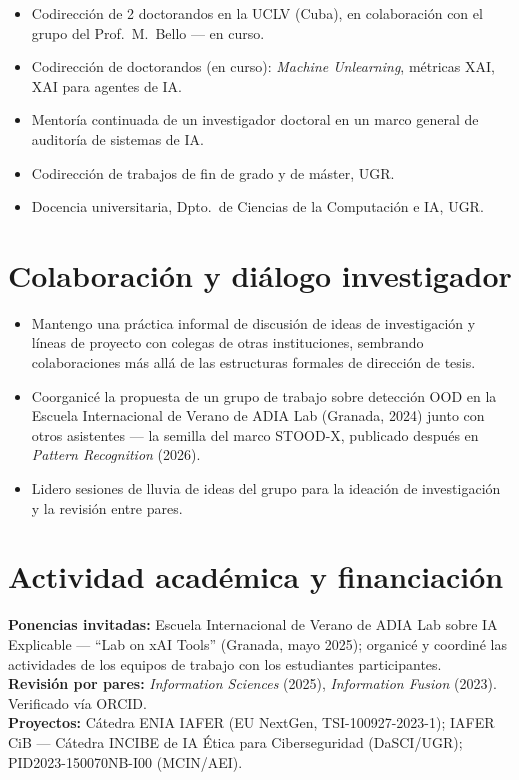 \documentclass[10pt,a4paper]{article}
\newcommand{\blueitem}[1]{\textcolor{subtitleblue}{\textbf{#1}}}
\begin{document}
\begin{itemize}
    \item Codirección de 2 doctorandos en la UCLV (Cuba), en colaboración con el grupo del Prof.~M.~Bello --- en curso.
    \item Codirección de doctorandos (en curso): \textit{Machine Unlearning}, métricas XAI, XAI para agentes de IA.
    \item Mentoría continuada de un investigador doctoral en un marco general de auditoría de sistemas de IA.
    \item Codirección de trabajos de fin de grado y de máster, UGR.
    \item Docencia universitaria, Dpto.~de Ciencias de la Computación e IA, UGR.
\end{itemize}

\section*{Colaboración y diálogo investigador}

\begin{itemize}
    \item Mantengo una práctica informal de discusión de ideas de investigación y líneas de proyecto con colegas de otras instituciones, sembrando colaboraciones más allá de las estructuras formales de dirección de tesis.
    \item Coorganicé la propuesta de un grupo de trabajo sobre detección OOD en la Escuela Internacional de Verano de ADIA Lab (Granada, 2024) junto con otros asistentes --- la semilla del marco STOOD-X, publicado después en \textit{Pattern Recognition} (2026).
    \item Lidero sesiones de lluvia de ideas del grupo para la ideación de investigación y la revisión entre pares.
\end{itemize}

\section*{Actividad académica y financiación}

\blueitem{Ponencias invitadas:} Escuela Internacional de Verano de ADIA Lab sobre IA Explicable --- ``Lab on xAI Tools'' (Granada, mayo 2025); organicé y coordiné las actividades de los equipos de trabajo con los estudiantes participantes. \\
\blueitem{Revisión por pares:} \textit{Information Sciences} (2025), \textit{Information Fusion} (2023). Verificado vía ORCID. \\
\blueitem{Proyectos:} Cátedra ENIA IAFER (EU NextGen, TSI-100927-2023-1); IAFER CiB --- Cátedra INCIBE de IA Ética para Ciberseguridad (DaSCI/UGR); PID2023-150070NB-I00 (MCIN/AEI).
\end{document}
